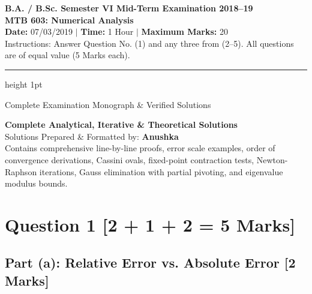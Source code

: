 \documentclass[11pt,a4paper]{article}
\begin{document}
\begin{center}
    {\Large\textbf{\color{navyblue}B.A. / B.Sc. Semester VI Mid-Term Examination 2018--19}}\\[4pt]
    {\LARGE\textbf{\color{accentblue}MTB 603: Numerical Analysis}}\\[6pt]
    {\normalsize\textbf{Date:} 07/03/2019 \quad $\vert$ \quad \textbf{Time:} 1 Hour \quad $\vert$ \quad \textbf{Maximum Marks:} 20}\\[2pt]
    {\small\color{darkgray}Instructions: Answer Question No. (1) and any three from (2--5). All questions are of equal value (5 Marks each).}
\end{center}
\vspace{-4pt}\hrule height 1pt\vspace{8pt}

\begin{notebox}{Complete Examination Monograph \& Verified Solutions}
\begin{center}
    {\large\textbf{\color{navyblue}Complete Analytical, Iterative \& Theoretical Solutions}}\\[3pt]
    {\normalsize Solutions Prepared \& Formatted by: \textbf{\color{crimsonred}\Large Anushka}}\\[2pt]
    {\small Contains comprehensive line-by-line proofs, error scale examples, order of convergence derivations, Cassini ovals, fixed-point contraction tests, Newton-Raphson iterations, Gauss elimination with partial pivoting, and eigenvalue modulus bounds.}
\end{center}
\end{notebox}

\vspace{6pt}

\section*{Question 1 \hfill \normalsize\normalfont\color{darkgray}[2 + 1 + 2 = 5 Marks]}

\subsection*{Part (a): Relative Error vs. Absolute Error \hfill \normalsize\normalfont\color{darkgray}[2 Marks]}
\end{document}

